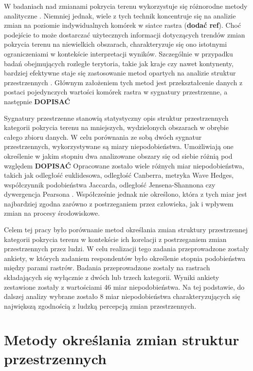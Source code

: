 \documentclass{amuthesis}
\begin{document}
W badaniach nad zmianami pokrycia terenu wykorzystuje się różnorodne
metody analityczne \autocite{ChangeDetectionTechniques}. Niemniej
jednak, wiele z tych technik koncentruje się na analizie zmian na
poziomie indywidualnych komórek w siatce rastra (\textbf{dodać ref}).
Choć podejście to może dostarczać użytecznych informacji dotyczących
trendów zmian pokrycia terenu na niewielkich obszarach, charakteryzuje
się ono istotnymi ograniczeniami w kontekście interpretacji wyników.
Szczególnie w przypadku badań obejmujących rozległe terytoria, takie jak
kraje czy nawet kontynenty, bardziej efektywne staje się zastosowanie
metod opartych na analizie struktur przestrzennych
\autocite{Netzel2015}. Głównym założeniem tych metod jest
przekształcenie danych z postaci pojedynczych wartości komórek rastra w
sygnatury przestrzenne, a następnie \textbf{DOPISAĆ}

Sygnatury przestrzenne stanowią statystyczny opis struktur
przestrzennych kategorii pokrycia terenu na mniejszych, wydzielonych
obszarach w obrębie całego zbioru danych. W celu porównania ze sobą
dwóch sygnatur przestrzennych, wykorzystywane są miary niepodobieństwa.
Umożliwiają one określenie w jakim stopniu dwa analizowane obszary się
od siebie różnią pod względem \textbf{DOPISAĆ} Opracowane zostało wiele
różnych miar niepodobieństwa, takich jak odległość euklidesowa,
odległość Canberra, metryka Wave Hedges, współczynnik podobieństwa
Jaccarda, odległość Jensena-Shannona czy dywergencja Pearsona
\autocite{Cha2007}. Współcześnie jednak nie określono, która z tych miar
jest najbardziej zgodna zarówno z postrzeganiem przez człowieka, jak i
wpływem zmian na procesy środowiskowe.

Celem tej pracy było porównanie metod określania zmian struktury
przestrzennej kategorii pokrycia terenu w kontekście ich korelacji z
postrzeganiem zmian przestrzennych przez ludzi. W celu realizacji tego
zadania przeprowadzone zostały ankiety, w których zadaniem respondentów
było określenie stopnia podobieństwa między parami rastrów. Badania
przeprowadzone zostały na rastrach składających się wyłącznie z dwóch
lub trzech kategorii. Wyniki ankiety zestawione zostały z wartościami 46
miar niepodobieństwa. Na tej podstawie, do dalszej analizy wybrane
zostało 8 miar niepodobieństwa charakteryzujących się największą
zgodnością z ludzką percepcją zmian przestrzennych.


\hypertarget{sec-lit}{%
\chapter{Metody określania zmian struktur
przestrzennych}\label{sec-lit}}
\end{document}
